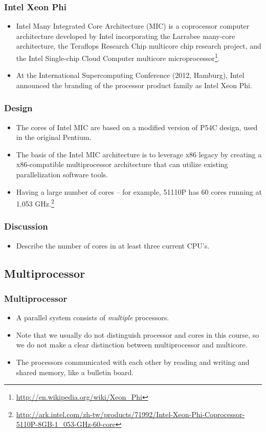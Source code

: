 \documentclass{beamer}
\begin{document}
\begin{CJK}{UTF8}{bsmi}
\begin{frame}
\frametitle{Intel Xeon Phi}
\begin{itemize}
\item Intel Many Integrated Core Architecture (MIC) is a coprocessor
  computer architecture developed by Intel incorporating the Larrabee
  many-core architecture, the Teraflops Research Chip multicore chip
  research project, and the Intel Single-chip Cloud Computer multicore
  microprocessor\footnote{\url{http://en.wikipedia.org/wiki/Xeon_Phi}}.
\item At the International Supercomputing Conference (2012, Hamburg),
  Intel announced the branding of the processor product family as
  Intel Xeon Phi.
\end{itemize}
\end{frame}

\begin{frame}
\frametitle{Design}
\begin{itemize}
\item The cores of Intel MIC are based on a modified version of P54C
  design, used in the original Pentium.
\item The basis of the Intel MIC architecture is to leverage x86
  legacy by creating a x86-compatible multiprocessor architecture that
  can utilize existing parallelization software tools.
\item Having a large number of cores -- for example, 51110P has 60
  cores running at 1.053 GHz.\footnote{\url{http://ark.intel.com/zh-tw/products/71992/Intel-Xeon-Phi-Coprocessor-5110P-8GB-1_053-GHz-60-core}}
\end{itemize}
\end{frame}

\begin{frame}
\frametitle{Discussion} 
\begin{itemize}
\item Describe the number of cores in at least three current CPU's.
\end{itemize}
\end{frame}


\subsection{Multiprocessor}

\begin{frame}
\frametitle{Multiprocessor} 
\begin{itemize}
\item A parallel system consists of {\em multiple} processors.
\item Note that we usually do not distinguish processor and cores in this course, so we do not make a clear distinction between multiprocessor and multicore.
\item The processors communicated with each other by reading and writing and shared memory, like a bulletin board.
\end{itemize}
\end{frame}


\end{CJK}
\end{document}
